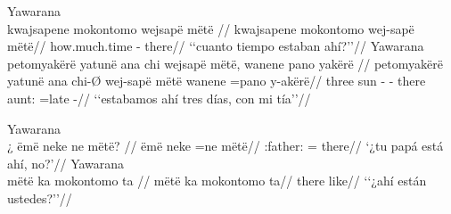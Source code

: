 \documentclass{memoir}
\begin{document}
\pex\label{loc-q-part-cop-nsubj}    \a Yawarana\\
    \label{convhistfamsjm-49}        \begingl
        \glpreamble kwajsapene mokontomo wejsapë mëtë //
        \gla kwajsapene mokontomo wej-sapë mëtë//
        \glb how.much.time  - there//
            \glft ‘‘cuanto tiempo estaban ahí?’’//  
        \endgl 
    \a Yawarana\\
    \label{convhistfamsjm-59}        \begingl
        \glpreamble petomyakërë yatunë ana chi wejsapë mëtë, wanene pano yakërë //
        \gla petomyakërë yatunë ana chi-Ø wej-sapë mëtë wanene =pano y-akërë//
        \glb three sun  - - there aunt: =late -//
            \glft ‘‘estabamos ahí tres días, con mi tía’’//  
        \endgl 
\xe

\pex\label{loc-q-part-nsubj}    \a Yawarana\\
    \label{convamgu-77}        \begingl
        \glpreamble ¿ ëmë neke ne mëtë? //
        \gla ëmë neke =ne mëtë//
        \glb {}:father:  = there//
            \glft ‘¿tu papá está ahí, no?’//  
        \endgl 
    \a Yawarana\\
    \label{ctowaru-66}        \begingl
        \glpreamble mëtë ka mokontomo ta //
        \gla mëtë ka mokontomo ta//
        \glb there   like//
            \glft ‘‘¿ahí están ustedes?’’//  
        \endgl 
\xe
\end{document}
